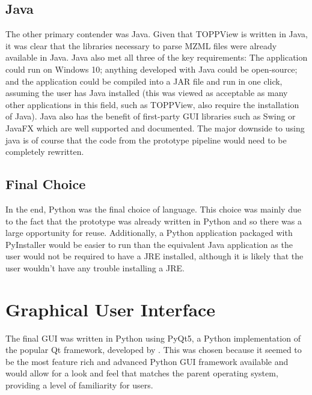 \documentclass{l4proj}
\begin{document}
\subsection{Java}
The other primary contender was Java. Given that TOPPView is written in Java, it was clear that the libraries necessary to parse MZML files were already available in Java. Java also met all three of the key requirements: The application could run on Windows 10; anything developed with Java could be open-source; and the application could be compiled into a JAR file and run in one click, assuming the user has Java installed (this was viewed as acceptable as many other applications in this field, such as TOPPView, also require the installation of Java). Java also has the benefit of first-party GUI libraries such as Swing or JavaFX which are well supported and documented. The major downside to using java is of course that the code from the prototype pipeline would need to be completely rewritten.

\subsection{Final Choice}
In the end, Python was the final choice of language. This choice was mainly due to the fact that the prototype was already written in Python and so there was a large opportunity for reuse. Additionally, a Python application packaged with PyInstaller would be easier to run than the equivalent Java application as the user would not be required to have a JRE installed, although it is likely that the user wouldn't have any trouble installing a JRE.


\section{Graphical User Interface} \label{gui-implementation}
The final GUI was written in Python using PyQt5, a Python implementation of the popular Qt framework, developed by \cite{PyQt5}. This was chosen because it seemed to be the most feature rich and advanced Python GUI framework available and would allow for a look and feel that matches the parent operating system, providing a level of familiarity for users.
\end{document}
